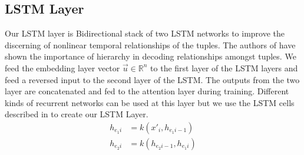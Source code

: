 \subsection{LSTM Layer}
\label{subsec:lstm}
Our LSTM layer is Bidirectional stack of 
two LSTM networks to improve the discerning of nonlinear temporal relationships 
of the tuples. The authors of \cite{yang2016hierarchical} have shown the 
importance of hierarchy in decoding relationships amongst tuples.  We feed the 
embedding layer vector $\vec{u} \in \mathbb{R}^n $ to the first layer of the 
LSTM layers and feed a reversed input to the second layer of the LSTM. The 
outputs from the two layer are concatenated and fed to the attention layer 
during training. Different kinds of recurrent networks can be used at this 
layer but we use the LSTM cells described in \cite{hochreiter1997long} to 
create our LSTM Layer. 
\begin{align}
h_{e_1i} &= k\left( x'_i,h_{e_1i-1} \right)
\label{eq:hiddenstate} \\
h_{e_2i} &= k\left( h_{e_2i-1},h_{e_1i} \right) 
\label{eq:layer-2}
\end{align}

